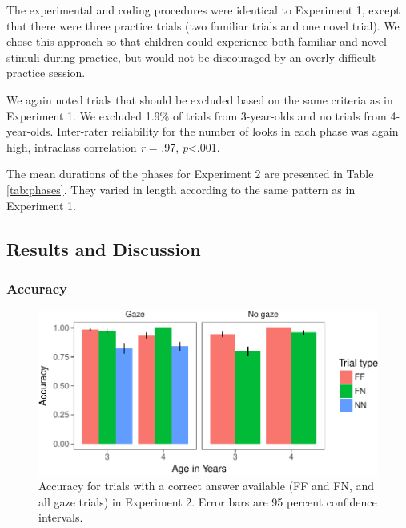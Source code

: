 \documentclass[english,man]{apa6}
\theoremstyle{definition}
\theoremstyle{definition}
\theoremstyle{definition}
\theoremstyle{remark}
\begin{document}
The experimental and coding procedures were identical to Experiment 1,
except that there were three practice trials (two familiar trials and
one novel trial). We chose this approach so that children could
experience both familiar and novel stimuli during practice, but would
not be discouraged by an overly difficult practice session.

We again noted trials that should be excluded based on the same criteria
as in Experiment 1. We excluded 1.9\% of trials from 3-year-olds and no
trials from 4-year-olds. Inter-rater reliability for the number of looks
in each phase was again high, intraclass correlation \emph{r} = .97,
\emph{p}\textless{}.001.

The mean durations of the phases for Experiment 2 are presented in Table
\ref{tab:phases}. They varied in length according to the same pattern as
in Experiment 1.

\subsection{Results and Discussion}\label{results-and-discussion-1}

\subsubsection{Accuracy}\label{accuracy-1}

\begin{figure}[htbp]
\centering
\includegraphics{figs/acce2-1.pdf}
\caption{\label{fig:acce2}Accuracy for trials with a correct answer
available (FF and FN, and all gaze trials) in Experiment 2. Error bars
are 95 percent confidence intervals.}
\end{figure}
\end{document}
